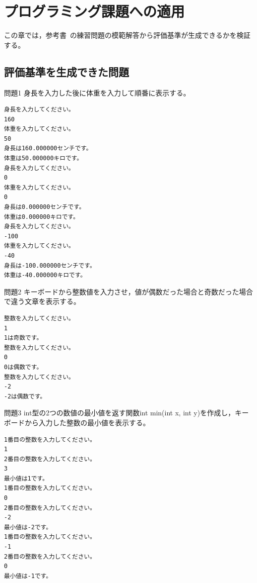 \documentclass{tpu-sotu}
\begin{document}
\chapter{プログラミング課題への適用}
この章では，参考書~\cite{b1}の練習問題の模範解答から評価基準が生成できるかを検証する。
\section{評価基準を生成できた問題}
\begin{itembox}[l]{問題1}
身長を入力した後に体重を入力して順番に表示する。
\end{itembox}



\begin{lstlisting}[xleftmargin=1cm]
身長を入力してください。
160
体重を入力してください。
50
身長は160.000000センチです。
体重は50.000000キロです。
身長を入力してください。
0
体重を入力してください。
0
身長は0.000000センチです。
体重は0.000000キロです。
身長を入力してください。
-100
体重を入力してください。
-40
身長は-100.000000センチです。
体重は-40.000000キロです。
\end{lstlisting}
\begin{itembox}[l]{問題2}
キーボードから整数値を入力させ，値が偶数だった場合と奇数だった場合で違う文章を表示する。
\end{itembox}



\begin{lstlisting}[xleftmargin=1cm]
整数を入力してください。
1
1は奇数です。
整数を入力してください。
0
0は偶数です。
整数を入力してください。
-2
-2は偶数です。
\end{lstlisting}
\begin{itembox}[l]{問題3}
int型の2つの数値の最小値を返す関数int min(int x, int y)を作成し，キーボードから入力した整数の最小値を表示する。
\end{itembox}



\begin{lstlisting}[xleftmargin=1cm]
1番目の整数を入力してください。
1
2番目の整数を入力してください。
3
最小値は1です。
1番目の整数を入力してください。
0
2番目の整数を入力してください。
-2
最小値は-2です。
1番目の整数を入力してください。
-1
2番目の整数を入力してください。
0
最小値は-1です。

\end{lstlisting}
\end{document}
